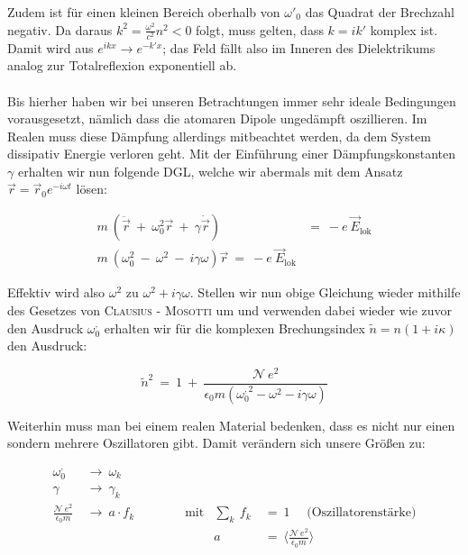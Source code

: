 Zudem ist für einen kleinen Bereich oberhalb von $\omega'_0$ das Quadrat der Brechzahl negativ. Da daraus $k^2 = \frac{\omega^2}{c^2} n^2 < 0$ folgt, muss gelten, dass $k=ik'$ komplex ist. Damit wird aus $e^{ikx} \rightarrow e^{-k'x}$; das Feld fällt also im Inneren des Dielektrikums analog zur Totalreflexion exponentiell ab.\\
\ \\
Bis hierher haben wir bei unseren Betrachtungen immer sehr ideale Bedingungen vorausgesetzt, nämlich dass die atomaren Dipole ungedämpft oszillieren. Im Realen muss diese Dämpfung allerdings mitbeachtet werden, da dem System dissipativ Energie verloren geht. Mit der Einführung einer Dämpfungskonstanten $\gamma$ erhalten wir nun folgende DGL, welche wir abermals mit dem Ansatz $\vec{r}= \vec{r}_0 e^{-i\omega t}$ lösen:

\begin{align*}
m \ \left(\ddot{\vec{r}} \ + \ \omega_0^2 \vec{r} \ + \ \gamma \dot{\vec{r}}\right)  \ &= \ -e \ \vec{E}_{\text{lok}}\\
m \ \left(\omega_0^2 \ - \ \omega^2 \ - \ i \gamma\omega\right)\vec{r} \ = \ -e \ \vec{E}_{\text{lok}}
\end{align*}

Effektiv wird  also $\omega^2$ zu $\omega^2 + i\gamma\omega$.
\newpage
Stellen wir nun obige Gleichung wieder mithilfe des Gesetzes von \textsc{Clausius - Mosotti} um und verwenden dabei wieder wie zuvor den Ausdruck $\omega^{,}_0$ erhalten wir für die komplexen Brechungsindex $\tilde{n}= n (1+i\kappa)$ den Ausdruck:

\begin{equation*}
\tilde{n}^2 \ = \ 1 \ + \ \frac{\mathcal{N} \ e^2}{\epsilon_0 m \left(\omega^{,2}_0 - \omega^2 - i \gamma\omega\right)}
\end{equation*}

Weiterhin muss man bei einem realen Material bedenken, dass es nicht nur einen sondern mehrere Oszillatoren gibt. Damit verändern sich unsere Größen zu:

\begin{align*}
\omega^{,}_0 \ &\rightarrow \ \omega_k\\
\gamma \ &\rightarrow \ \gamma_k\\
\frac{\mathcal{N} \ e^2}{\epsilon_0 m} \ &\rightarrow \ a \cdot f_k \qquad\qquad \text{mit}  &\sum_k \ f_k  \ &= \ 1 \quad \text{  (Oszillatorenstärke)}\\
& &a \ &= \ \Bigg\langle\frac{\mathcal{N}\ e^2}{\epsilon_0 m}\Bigg\rangle
\end{align*}

